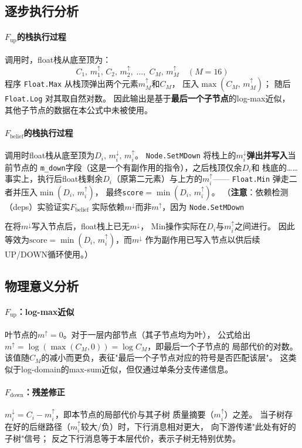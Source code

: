 \documentclass[12pt, a4paper]{ctexart}
\newcommand{\cbox}[1]{%
  \begingroup
  \setlength{\fboxsep}{4pt}%
  \colorbox{ccode}{\texttt{\small #1}}%
  \endgroup
}
\begin{document}
\subsection{逐步执行分析}

\paragraph{$F_{\mathrm{up}}$的栈执行过程}
调用时，float栈从底至顶为：
\[
  C_1,\,m^\uparrow_1,\,C_2,\,m^\uparrow_2,\;\ldots,\;C_M,\,m^\uparrow_M
  \quad (M=16)
\]
程序\cbox{Float.Max}从栈顶弹出两个元素$m^\uparrow_M$和$C_M$，
压入$\max(C_M,\,m^\uparrow_M)$；
随后\cbox{Float.Log}对其取自然对数。
因此输出是基于\textbf{最后一个子节点}的log-max近似，
其他子节点的数据在本公式中未被使用。

\paragraph{$F_{\mathrm{belief}}$的栈执行过程}
调用时float栈从底至顶为$D_i,\,m^\downarrow_i,\,m^\uparrow_i$。
\cbox{Node.SetMDown}将栈上的$m^\downarrow_i$\textbf{弹出并写入}当前节点的
\texttt{m\_down}字段（这是一个有副作用的指令），之后栈顶仅余$D_i$和
栈底的……事实上，执行后float栈剩余$D_i$（原第二元素）与上方的$m^\uparrow_i$——
\cbox{Float.Min}弹走二者并压入$\min(D_i,\,m^\uparrow_i)$，
最终\texttt{score}$=\min(D_i,\,m^\uparrow_i)$。
（\textbf{注意}：依赖检测（deps）实验证实$F_{\mathrm{belief}}$
实际依赖$m^\downarrow$而非$m^\uparrow$，因为\cbox{Node.SetMDown}
在将$m^\downarrow$写入节点后，float栈上已无$m^\downarrow$，
Min操作实际在$D_i$与$m^\uparrow_i$之间进行。
因此等效为$\mathrm{score}=\min(D_i,\,m^\uparrow_i)$，而$m^\downarrow$
作为副作用已写入节点以供后续UP/DOWN循环使用。）

\subsection{物理意义分析}

\paragraph{$F_{\mathrm{up}}$：log-max近似}
叶节点的$m^\uparrow=0$。对于一层内部节点（其子节点均为叶），
公式给出$m^\uparrow=\log(\max(C_M, 0))=\log C_M$，即最后一个子节点的
局部代价的对数。
该值随$C_M$的减小而更负，表征"最后一个子节点对应的符号是否匹配该层"。
这类似于log-domain的max-sum近似，但仅通过单条分支传递信息。

\paragraph{$F_{\mathrm{down}}$：残差修正}
$m^\downarrow_i = C_i - m^\uparrow_i$，即本节点的局部代价与其子树
质量摘要（$m^\uparrow_i$）之差。
当子树存在好的后继路径（$m^\uparrow_i$较大/负）时，下行消息相对更大，
向下游传递"此处有好的子树"信号；
反之下行消息等于本层代价，表示子树无特别优势。
\end{document}
